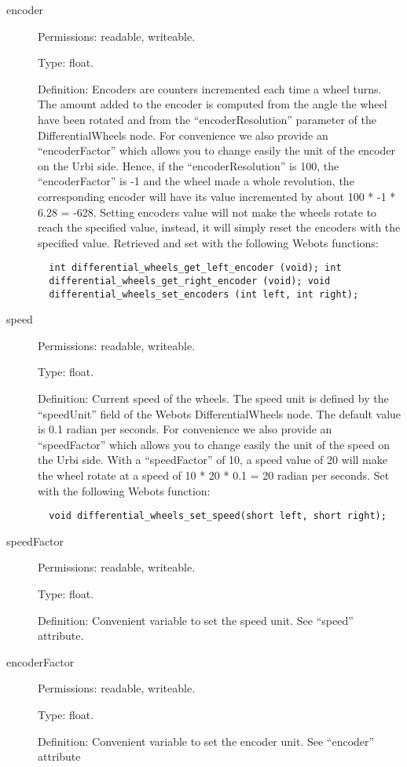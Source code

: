 \noindent
\begin{description}
\item[{encoder}] Permissions: readable, writeable.


  Type: float.


  Definition: Encoders are counters incremented each time a wheel
  turns. The amount added to the encoder is computed from the angle
  the wheel have been rotated and from the ``encoderResolution''
  parameter of the DifferentialWheels node. For convenience we also
  provide an ``encoderFactor'' which allows you to change easily the
  unit of the encoder on the Urbi side.  Hence, if the
  ``encoderResolution'' is 100, the ``encoderFactor'' is -{}1 and the
  wheel made a whole revolution, the corresponding encoder will have
  its value incremented by about 100 * -{}1 * 6.28 = -{}628.  Setting
  encoders value will not make the wheels rotate to reach the
  specified value, instead, it will simply reset the encoders with the
  specified value.  Retrieved and set with the following Webots
  functions:


\begin{lstlisting}
  int differential_wheels_get_left_encoder (void); int
  differential_wheels_get_right_encoder (void); void
  differential_wheels_set_encoders (int left, int right);
\end{lstlisting}
\item[{speed}] Permissions: readable, writeable.


  Type: float.


  Definition: Current speed of the wheels. The speed unit is defined
  by the ``speedUnit'' field of the Webots DifferentialWheels node. The
  default value is 0.1 radian per seconds. For convenience we also
  provide an ``speedFactor'' which allows you to change easily the unit
  of the speed on the Urbi side.  With a ``speedFactor'' of 10, a speed
  value of 20 will make the wheel rotate at a speed of 10 * 20 * 0.1 =
  20 radian per seconds.  Set with the following Webots function:


\begin{lstlisting}
  void differential_wheels_set_speed(short left, short right);
\end{lstlisting}
\item[{speedFactor}] Permissions: readable, writeable.


  Type: float.


  Definition: Convenient variable to set the speed unit. See ``speed''
  attribute.

\item[{encoderFactor}] Permissions: readable, writeable.


  Type: float.


  Definition: Convenient variable to set the encoder unit. See
  ``encoder'' attribute

\end{description}

